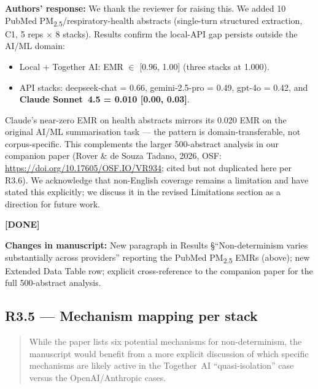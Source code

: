 \documentclass[11pt,a4paper]{article}
\newenvironment{revquote}{%
  \begin{quote}\small\itshape\color{revgray}
}{%
  \end{quote}
}
\newcommand{\response}[1]{\par\noindent\textbf{\color{revgreen}Authors' response:} #1\par}
\newcommand{\changes}[1]{\par\noindent\textbf{\color{revblue}Changes in manuscript:} #1\par}
\newcommand{\done}{\color{revgreen}\textbf{[DONE]}}
\begin{document}
\response{We thank the reviewer for raising this. We added 10 PubMed PM\textsubscript{2.5}/respiratory-health abstracts (single-turn structured extraction, C1, 5 reps $\times$ 8 stacks). Results confirm the local-API gap persists outside the AI/ML domain:

\begin{itemize}[leftmargin=*]
  \item Local + Together AI: EMR $\in$ [0.96, 1.00] (three stacks at 1.000).
  \item API stacks: deepseek-chat = 0.66, gemini-2.5-pro = 0.49, gpt-4o = 0.42, and \textbf{Claude Sonnet~4.5 = 0.010 [0.00, 0.03]}.
\end{itemize}

Claude's near-zero EMR on health abstracts mirrors its 0.020 EMR on the original AI/ML summarisation task --- the pattern is domain-transferable, not corpus-specific. This complements the larger 500-abstract analysis in our companion paper (Rover \& de Souza Tadano, 2026, OSF: \url{https://doi.org/10.17605/OSF.IO/VR934}; cited but not duplicated here per R3.6). We acknowledge that non-English coverage remains a limitation and have stated this explicitly; we discuss it in the revised Limitations section as a direction for future work.} \done

\changes{New paragraph in Results §``Non-determinism varies substantially across providers'' reporting the PubMed PM\textsubscript{2.5} EMRs (above); new Extended Data Table row; explicit cross-reference to the companion paper for the full 500-abstract analysis.}

\subsection*{R3.5 --- Mechanism mapping per stack}

\begin{revquote}
While the paper lists six potential mechanisms for non-determinism, the manuscript would benefit from a more explicit discussion of which specific mechanisms are likely active in the Together~AI ``quasi-isolation'' case versus the OpenAI/Anthropic cases.
\end{revquote}
\end{document}
